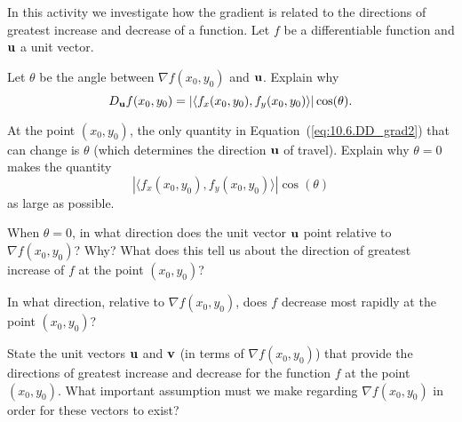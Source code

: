 \begin{activity} \label{A:10.6.3} In this activity we investigate how the gradient is related to the directions of greatest increase and decrease of a function.  Let $f$ be a differentiable function and $\mathbf{u}$ a unit vector.
\ba
    \item Let $\theta$ be the angle between $\nabla f(x_0,y_0)$ and $\mathbf{u}$.  Explain why
\begin{equation}
D_{\mathbf{u}} f(x_0,y_0) = |\langle f_x(x_0,y_0), f_y(x_0,y_0) \rangle | \cos(\theta). \label{eq:10.6.DD_grad2}
\end{equation}

    \item At the point $(x_0,y_0)$, the only quantity in Equation~(\ref{eq:10.6.DD_grad2}) that can change is $\theta$ (which determines the direction $\mathbf{u}$ of travel). Explain why $\theta = 0$ makes the quantity 
\[|\langle f_x(x_0,y_0), f_y(x_0,y_0) \rangle| \cos(\theta)\]
as large as possible.


    \item When $\theta = 0$, in what direction does the unit vector $\mathbf{u}$ point relative to $\nabla f(x_0,y_0)$? Why? What does this tell us about the direction of greatest increase of $f$ at the point $(x_0,y_0)$?
    
    \item In what direction, relative to $\nabla f(x_0,y_0)$, does $f$ decrease most rapidly at the point $(x_0,y_0)$?
    
    \item State the unit vectors $\mathbf{u}$ and $\mathbf{v}$ (in terms of $\nabla f(x_0,y_0)$) that provide the directions of greatest increase and decrease for the function $f$ at the point $(x_0,y_0)$.  What important assumption must we make regarding $\nabla f(x_0,y_0)$ in order for these vectors to exist?


    \ea



\end{activity}
\begin{smallhint}

\end{smallhint}
\begin{bighint}

\end{bighint}

